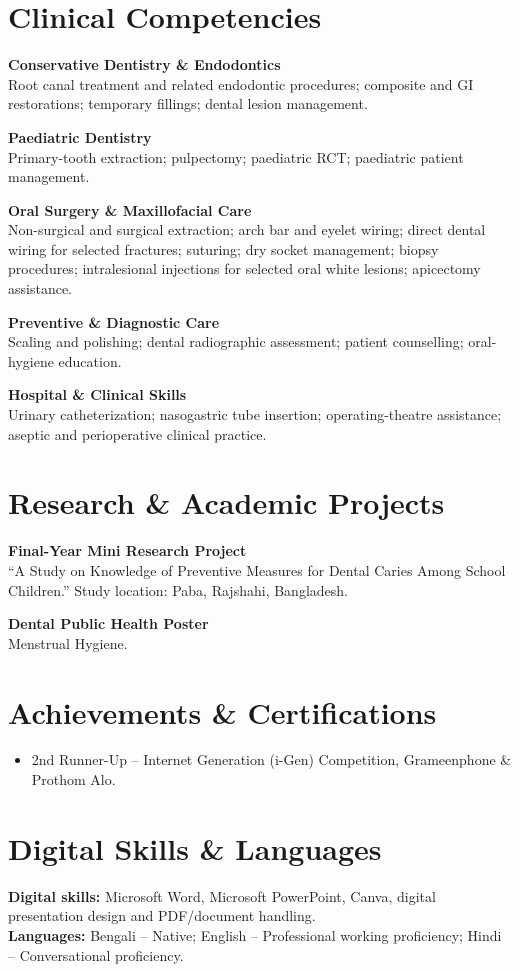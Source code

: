 \documentclass[10pt,a4paper]{article}
\newcommand{\skill}[2]{\textbf{#1}\\#2\par}
\begin{document}
\newpage
\section{Clinical Competencies}
\skill{Conservative Dentistry \& Endodontics}{Root canal treatment and related endodontic procedures; composite and GI restorations; temporary fillings; dental lesion management.}
\skill{Paediatric Dentistry}{Primary-tooth extraction; pulpectomy; paediatric RCT; paediatric patient management.}
\skill{Oral Surgery \& Maxillofacial Care}{Non-surgical and surgical extraction; arch bar and eyelet wiring; direct dental wiring for selected fractures; suturing; dry socket management; biopsy procedures; intralesional injections for selected oral white lesions; apicectomy assistance.}
\skill{Preventive \& Diagnostic Care}{Scaling and polishing; dental radiographic assessment; patient counselling; oral-hygiene education.}
\skill{Hospital \& Clinical Skills}{Urinary catheterization; nasogastric tube insertion; operating-theatre assistance; aseptic and perioperative clinical practice.}

\section{Research \& Academic Projects}
\textbf{Final-Year Mini Research Project}\\
``A Study on Knowledge of Preventive Measures for Dental Caries Among School Children.'' Study location: Paba, Rajshahi, Bangladesh.

\textbf{Dental Public Health Poster}\\
Menstrual Hygiene.

\section{Achievements \& Certifications}
\begin{itemize}
\item 2nd Runner-Up -- Internet Generation (i-Gen) Competition, Grameenphone \& Prothom Alo.
\end{itemize}

\section{Digital Skills \& Languages}
\textbf{Digital skills:} Microsoft Word, Microsoft PowerPoint, Canva, digital presentation design and PDF/document handling.\\[3pt]
\textbf{Languages:} Bengali -- Native; English -- Professional working proficiency; Hindi -- Conversational proficiency.
\end{document}
